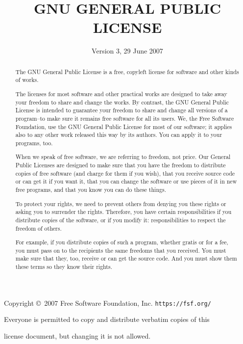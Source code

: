 \documentclass[11pt]{article}
\title{GNU GENERAL PUBLIC LICENSE}
\date{Version 3, 29 June 2007}
\begin{document}
\maketitle

\begin{center}
{\parindent 0in

Copyright \copyright\  2007 Free Software Foundation, Inc. \texttt{https://fsf.org/}

\bigskip
Everyone is permitted to copy and distribute verbatim copies of this

license document, but changing it is not allowed.}

\end{center}

\renewcommand{\abstractname}{Preamble}
\begin{abstract}
The GNU General Public License is a free, copyleft license for
software and other kinds of works.

The licenses for most software and other practical works are designed
to take away your freedom to share and change the works.  By contrast,
the GNU General Public License is intended to guarantee your freedom to
share and change all versions of a program--to make sure it remains free
software for all its users.  We, the Free Software Foundation, use the
GNU General Public License for most of our software; it applies also to
any other work released this way by its authors.  You can apply it to
your programs, too.

When we speak of free software, we are referring to freedom, not
price.  Our General Public Licenses are designed to make sure that you
have the freedom to distribute copies of free software (and charge for
them if you wish), that you receive source code or can get it if you
want it, that you can change the software or use pieces of it in new
free programs, and that you know you can do these things.

To protect your rights, we need to prevent others from denying you
these rights or asking you to surrender the rights.  Therefore, you have
certain responsibilities if you distribute copies of the software, or if
you modify it: responsibilities to respect the freedom of others.

For example, if you distribute copies of such a program, whether
gratis or for a fee, you must pass on to the recipients the same
freedoms that you received.  You must make sure that they, too, receive
or can get the source code.  And you must show them these terms so they
know their rights.


\end{abstract}
\end{document}

